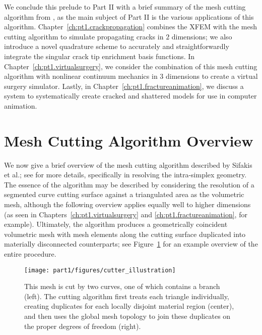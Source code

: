 We conclude this prelude to Part II with a brief summary of the mesh cutting algorithm from \cite{Sifakis07}, as the main subject of Part II is the various applications of this algorithm. Chapter~\ref{ch:pt1.crackpropagation} combines the XFEM with the mesh cutting algorithm to simulate propagating cracks in $2$ dimensions; we also introduce a novel quadrature scheme to accurately and straightforwardly integrate the singular crack tip enrichment basis functions. In Chapter~\ref{ch:pt1.virtualsurgery}, we consider the combination of this mesh cutting algorithm with nonlinear continuum mechanics in $3$ dimensions to create a virtual surgery simulator. Lastly, in Chapter~\ref{ch:pt1.fractureanimation}, we discuss a system to systematically create cracked and shattered models for use in computer animation.

\section*{Mesh Cutting Algorithm Overview}

We now give a brief overview of the mesh cutting algorithm described by Sifakis et al.; see \cite{Sifakis07} for more details, specifically in resolving the intra-simplex geometry. The essence of the algorithm may be described by considering the resolution of a segmented curve cutting surface against a triangulated area as the volumetric mesh, although the following overview applies equally well to higher dimensions (as seen in Chapters~\ref{ch:pt1.virtualsurgery} and \ref{ch:pt1.fractureanimation}, for example). Ultimately, the algorithm produces a geometrically coincident volumetric mesh with mesh elements along the cutting surface duplicated into materially disconnected counterparts; see Figure~\ref{fig:pt1.cutting.example} for an example overview of the entire procedure.

\setlength{\figurewidth}{\columnwidth}
\begin{figure}[htbp]
\begin{center}
\texttt{[image: part1/figures/cutter\_illustration]}
\caption{This mesh is cut by two curves, one of which contains a branch (left). The cutting algorithm first treats each triangle individually, creating duplicates for each locally disjoint material region (center), and then uses the global mesh topology to join these duplicates on the proper degrees of freedom (right). }
\label{fig:pt1.cutting.example}
\end{center}
\end{figure}

